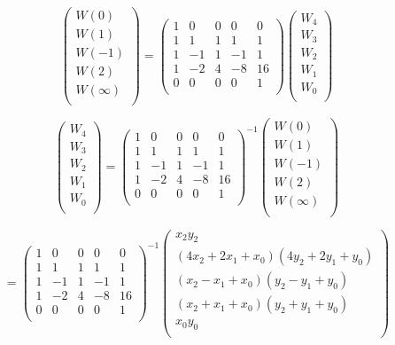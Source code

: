 \documentclass[letterpaper]{article}
\begin{document}
$$
\begin{pmatrix}
  W (0) \\
  W (1) \\
  W (-1) \\
  W (2) \\
  W (\infty) \\
\end{pmatrix}
 =
\begin{pmatrix}
  1 & 0 & 0 & 0 & 0 \\
  1 & 1 & 1 & 1 & 1 \\
  1 &-1 & 1 &-1 & 1 \\
  1 &-2 & 4 &-8 &16 \\
  0 & 0 & 0 & 0 & 1 \\
\end{pmatrix}
\begin{pmatrix}
  W_4 \\
  W_3 \\
  W_2 \\
  W_1 \\
  W_0 \\
\end{pmatrix}
$$

$$
\begin{pmatrix}
  W_4 \\
  W_3 \\
  W_2 \\
  W_1 \\
  W_0 \\
 \end{pmatrix}
=
\begin{pmatrix}
  1 & 0 & 0 & 0 & 0 \\
  1 & 1 & 1 & 1 & 1 \\
  1 &-1 & 1 &-1 & 1 \\
  1 &-2 & 4 &-8 &16 \\
  0 & 0 & 0 & 0 & 1 \\
\end{pmatrix}^{-1}
\begin{pmatrix}
  W (0) \\
  W (1) \\
  W (-1) \\
  W (2) \\
  W (\infty) \\
\end{pmatrix}
$$

$$
=
\begin{pmatrix}
  1 & 0 & 0 & 0 & 0 \\
  1 & 1 & 1 & 1 & 1 \\
  1 &-1 & 1 &-1 & 1 \\
  1 &-2 & 4 &-8 &16 \\
  0 & 0 & 0 & 0 & 1 \\
\end{pmatrix}^{-1}
\begin{pmatrix}
  x_2y_2 \\
  (4x_2 + 2x_1 + x_0) (4y_2+ 2y_1 + y_0)\\
  (x_2 - x_1 + x_0) (y_2 - y_1 + y_0)\\
  (x_2 + x_1 + x_0) (y_2 + y_1 + y_0)\\
  x_0y_0\\
\end{pmatrix}
$$
\end{document}
